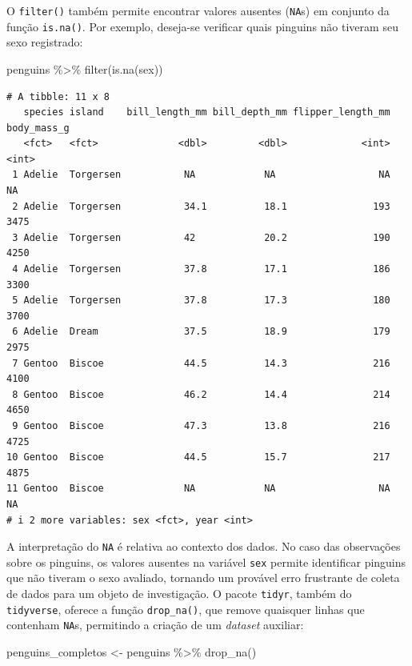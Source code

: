 \documentclass[
  12pt,
  letterpaper,
  DIV=11,
  numbers=noendperiod]{scrreprt}
\newenvironment{Shaded}{\begin{snugshade}}{\end{snugshade}}
\newcommand{\FunctionTok}[1]{\textcolor[rgb]{0.28,0.35,0.67}{#1}}
\newcommand{\NormalTok}[1]{\textcolor[rgb]{0.00,0.23,0.31}{#1}}
\newcommand{\OtherTok}[1]{\textcolor[rgb]{0.00,0.23,0.31}{#1}}
\newcommand{\SpecialCharTok}[1]{\textcolor[rgb]{0.37,0.37,0.37}{#1}}
\theoremstyle{definition}
\theoremstyle{exemplo}
\begin{document}
O \texttt{filter()} também permite encontrar valores ausentes
(\texttt{NA}s) em conjunto da função \texttt{is.na()}. Por exemplo,
deseja-se verificar quais pinguins não tiveram seu sexo registrado:

\begin{Shaded}
\begin{Highlighting}[]
\NormalTok{penguins }\SpecialCharTok{\%\textgreater{}\%} 
  \FunctionTok{filter}\NormalTok{(}\FunctionTok{is.na}\NormalTok{(sex))}
\end{Highlighting}
\end{Shaded}

\begin{verbatim}
# A tibble: 11 x 8
   species island    bill_length_mm bill_depth_mm flipper_length_mm body_mass_g
   <fct>   <fct>              <dbl>         <dbl>             <int>       <int>
 1 Adelie  Torgersen           NA            NA                  NA          NA
 2 Adelie  Torgersen           34.1          18.1               193        3475
 3 Adelie  Torgersen           42            20.2               190        4250
 4 Adelie  Torgersen           37.8          17.1               186        3300
 5 Adelie  Torgersen           37.8          17.3               180        3700
 6 Adelie  Dream               37.5          18.9               179        2975
 7 Gentoo  Biscoe              44.5          14.3               216        4100
 8 Gentoo  Biscoe              46.2          14.4               214        4650
 9 Gentoo  Biscoe              47.3          13.8               216        4725
10 Gentoo  Biscoe              44.5          15.7               217        4875
11 Gentoo  Biscoe              NA            NA                  NA          NA
# i 2 more variables: sex <fct>, year <int>
\end{verbatim}

A interpretação do \texttt{NA} é relativa ao contexto dos dados. No caso
das observações sobre os pinguins, os valores ausentes na variável
\texttt{sex} permite identificar pinguins que não tiveram o sexo
avaliado, tornando um provável erro frustrante de coleta de dados para
um objeto de investigação. O pacote \texttt{tidyr}, também do
\texttt{tidyverse}, oferece a função \texttt{drop\_na()}, que remove
quaisquer linhas que contenham \texttt{NA}s, permitindo a criação de um
\emph{dataset} auxiliar:

\begin{Shaded}
\begin{Highlighting}[]
\NormalTok{penguins\_completos }\OtherTok{\textless{}{-}}\NormalTok{ penguins }\SpecialCharTok{\%\textgreater{}\%} 
  \FunctionTok{drop\_na}\NormalTok{()}
\end{Highlighting}
\end{Shaded}
\end{document}

